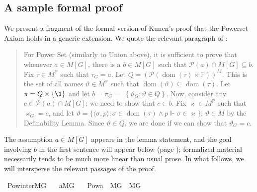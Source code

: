 \subsection{A sample formal proof}
\label{sec:sample-formal-proof}

We present a fragment of the formal version of Kunen's proof that the
Powerset Axiom holds in a generic extension. We quote the relevant
paragraph of \cite[Thm.~IV.2.27]{kunen2011set}:
\begin{quote}
  For Power Set (similarly to Union above), it is sufficient to prove
  that whenever $a \in M[G]$, there is a $b \in M[G]$ such that
  $\mathcal{P}(a) \cap M[G] \subseteq b$. Fix $\tau \in
  M^{\mathbb{P}}$ such that $\tau_{G}=a$. Let
  $Q=(\mathcal{P}(\operatorname{dom}(\tau) \times
  \mathbb{P}))^{M}$. This is the set of all names $\vartheta \in
  M^{\mathbb{P}}$ such that $\operatorname{dom}(\vartheta) \subseteq
  \operatorname{dom}(\tau)$. Let $\pi=Q \times\{\1\}$ and let
  $b=\pi_{G}=$ $\left\{\vartheta_{G}: \vartheta \in Q\right\}$. Now,
  consider any $c \in \mathcal{P}(a) \cap M[G]$; we need to show that
  $c \in b$. Fix $\varkappa \in M^{\mathbb{P}}$ such that
  $\varkappa_{G}=c$, and let $\vartheta=\{\langle\sigma, p\rangle:
  \sigma \in \operatorname{dom}(\tau) \wedge p \Vdash \sigma \in
  \varkappa\}$; $\vartheta \in M$ by the Definability Lemma. Since
  $\vartheta \in Q$, we are done if we can show that
  $\vartheta_{G}=c$.
\end{quote}
The assumption $a\in M[G]$ appears in the lemma statement, and the
goal involving $b$ in the first sentence will appear below (page \pageref{goal-on-b}); formalized
material necessarily tends to be much more linear than usual prose. In
what follows, we
will intersperse the relevant passages of the proof.
\begin{isabelle}
\isamarkupfalse%
\ Pow{\isacharunderscore}{\kern0pt}inter{\isacharunderscore}{\kern0pt}MG{\isacharcolon}{\kern0pt}\isanewline
\ \ \ {\isachardoublequoteopen}a{\isasymin}M{\isacharbrackleft}{\kern0pt}G{\isacharbrackright}{\kern0pt}{\isachardoublequoteclose}\isanewline
\ \ \ {\isachardoublequoteopen}Pow{\isacharparenleft}{\kern0pt}a{\isacharparenright}{\kern0pt}\ {\isasyminter}\ M{\isacharbrackleft}{\kern0pt}G{\isacharbrackright}{\kern0pt}\ {\isasymin}\ M{\isacharbrackleft}{\kern0pt}G{\isacharbrackright}{\kern0pt}{\isachardoublequoteclose}\isanewline
%
\isamarkupfalse%
\ {\isacharminus}{\kern0pt}
\end{isabelle}
